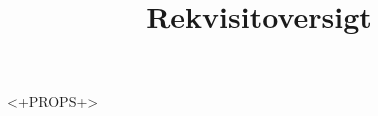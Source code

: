 \documentclass{ucph-revy}
\title{Rekvisitoversigt}
\begin{document}
\maketitle

<+PROPS+>
\end{document}
